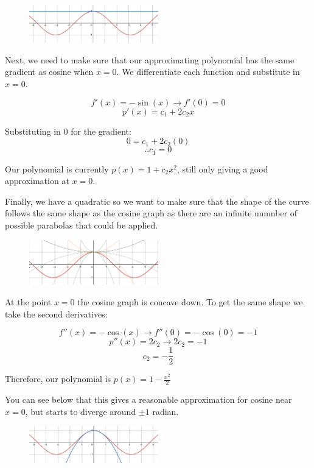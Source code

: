 \documentclass[../main.tex]{subfiles}
\begin{document}
\begin{figure}[h]
    \centering
    \includegraphics[width=0.5\textwidth]{images/taylorseries2.png}
\end{figure}

Next, we need to make sure that our approximating polynomial has the same gradient as cosine when $x=0$. We differentiate each function and substitute in $x=0$.

\[f'(x)=-\sin{(x)} \rightarrow f'(0)=0\]
\[p'(x)=c_1 + 2c_2x\]

Substituting in 0 for the gradient:
\[0=c_1 + 2c_2(0)\]
\[\therefore c_1=0\]

Our polynomial is currently $p(x) = 1 + c_2x^2$, still only giving a good approximation at $x=0$.

Finally, we have a quadratic so we want to make sure that the shape of the curve follows the same shape as the cosine graph as there are an infinite numnber of possible parabolas that could be applied. 

\begin{figure}[h]
    \centering
    \includegraphics[width=0.5\textwidth]{images/taylorseries3a.png}
\end{figure}

At the point $x=0$ the cosine graph is concave down. To get the same shape we take the second derivatives:

\[f''(x)=-\cos{(x)} \rightarrow f''(0)=-\cos{(0)}=-1\]
\[p''(x)= 2c_2 \rightarrow 2c_2 = -1\]
\[c_2 = -\frac{1}{2}\]

Therefore, our polynomial is $p(x) = 1 - \frac{x^2}{2}$ 

You can see below that this gives a reasonable approximation for cosine near $x=0$, but starts to diverge around $\pm1$ radian.

\begin{figure}[h]
    \centering
    \includegraphics[width=0.5\textwidth]{images/taylorseries3.png}
\end{figure}
\end{document}
